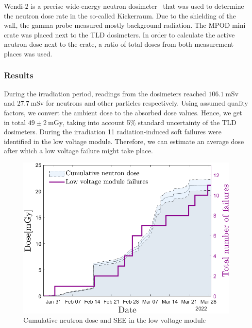 Wendi-2 is a precise wide-energy neutron dosimeter~\cite{wendi} that was used to determine the neutron dose rate in the so-called Kickerraum. Due to the shielding of the wall, the gamma probe measured mostly background radiation. The MPOD mini crate was placed next to the TLD dosimeters. In order to calculate the active neutron dose next to the crate, a ratio of total doses from both measurement places was used. 
\newpage
\subsubsection{Results}
During the irradiation period, readings from the dosimeters reached $106.1\mathrm{\ mSv}$ and $27.7\mathrm{\ mSv}$ for neutrons and other particles respectively.
Using assumed quality factors, we convert the ambient dose to the absorbed dose values. Hence, we get in total $49\pm{2}\mathrm{\ mGy}$, taking into account 5\% standard uncertainty of the TLD dosimeters. During the irradiation 11 radiation-induced soft failures were identified in the low voltage module. Therefore, we can estimate an average dose after which a low voltage failure might take place.
\begin{figure}[!h]
    \centering
    \includegraphics[width=0.57\columnwidth]{Chapter3/Irradiation/images/LV_failure_and_neutronsrate.png}
    \caption{Cumulative neutron dose and SEE in the low voltage module}
    \label{fig:lv_neutrons}
\end{figure}
